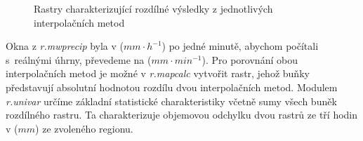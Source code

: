 \documentclass[a4paper,12pt,oneside]{report}
\begin{document}
\begin{figure}[h!]%
    \centering
    \qquad
    \qquad
    \qquad
    \caption[Průměr metod]{ Rastry charakterizující rozdílné výsledky z jednotlivých interpolačních metod\centering}

\end{figure}


Okna z \textit{r.mwprecip} byla v ($mm \cdot h^{-1}$) po jedné minutě,
abychom počítali s~reálnými úhrny, převedeme na ($mm \cdot min^{-1}$).
Pro porovnání obou interpolačních metod je možné v \textit{r.mapcalc}
vytvořit rastr, jehož buňky představují absolutní hodnotou rozdílu
dvou interpolačních metod. Modulem \textit{r.univar} určíme základní
statistické charakteristiky včetně sumy všech buněk rozdílného
rastru. Ta charakterizuje objemovou odchylku dvou rastrů ze tří hodin
v ($mm$) ze zvoleného regionu.
\end{document}
